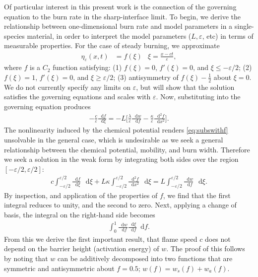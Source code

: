 \documentclass[colorinlistoftodos,review]{elsarticle}
\newcommand*\diff{\mathop{}\!\mathrm{d}}
\begin{document}
Of particular interest in this present work is the connection of the governing equation to the burn rate in the sharp-interface limit.
To begin, we derive the relationship between one-dimensional burn rate and model parameters in a single-species material, in order to interpret the model parameters ($L,\varepsilon$, etc) in terms of measurable properties.
For the case of steady burning, we approximate
\begin{align}
  \eta_\varepsilon(x,t) &= f(\xi)  &   \xi = \frac{x-ct}{\varepsilon},
\end{align}
where $f$ is a $C_2$ function satisfying: (1) $f(\xi)=0$, $f'(\xi)=0$, and $\xi\le-\varepsilon/2$; (2) $f(\xi)=1$, $f'(\xi)=0$, and $\xi\ge\varepsilon/2$; (3) antisymmetry of $f(\xi)- \frac{1}{2}$ about $\xi=0$.
We do not currently specify any limits on $\varepsilon$, but will show that the solution satisfies the governing equations and scales with $\varepsilon$.
Now, substituting into the governing equation produces
\begin{align}
  -\frac{c}{\varepsilon}\frac{\diff f}{\diff \xi} = -L\Big[\frac{\lambda}{\varepsilon}\frac{\diff w}{\diff f} - \frac{\kappa}{\varepsilon}\frac{\diff^2f}{\diff x^2}\Big].\label{eq:subswithf}
\end{align}
The nonlinearity induced by the chemical potential renders \cref{eq:subswithf} unsolvable in the general case, which is undesirable as we seek a general relationship between the chemical potential, mobility, and burn width.
Therefore we seek a solution in the weak form by integrating both sides over the region $[-\varepsilon/2,\varepsilon/2]$:
\begin{align}
  c\int_{-\varepsilon/2}^{\varepsilon/2}\frac{\diff f}{\diff \xi}\,\diff \xi + L\kappa\int_{-\varepsilon/2}^{\varepsilon/2}\frac{\diff^2f}{\diff x^2}\,\diff \xi = L\int_{-\varepsilon/2}^{\varepsilon/2}\frac{\diff w}{\diff f}\,\diff \xi.
\end{align}
By inspection, and application of the properties of $f$, we find that the first integral reduces to unity, and the second to zero.
Next, applying a change of basis, the integral on the right-hand side becomes
\begin{align}
  \int_0^1\frac{\diff w}{\diff f}\frac{\diff \xi}{\diff f}\diff f.\label{eq:dwdfdxidf}
\end{align}
From this we derive the first important result, that flame speed $c$ does not depend on the barrier height (activation energy) of $w$.
The proof of this follows by noting that $w$ can be additively decomposed into two functions that are symmetric and antisymmetric about $f=0.5$; $w(f) = w_s(f) + w_a(f)$. 
\end{document}
